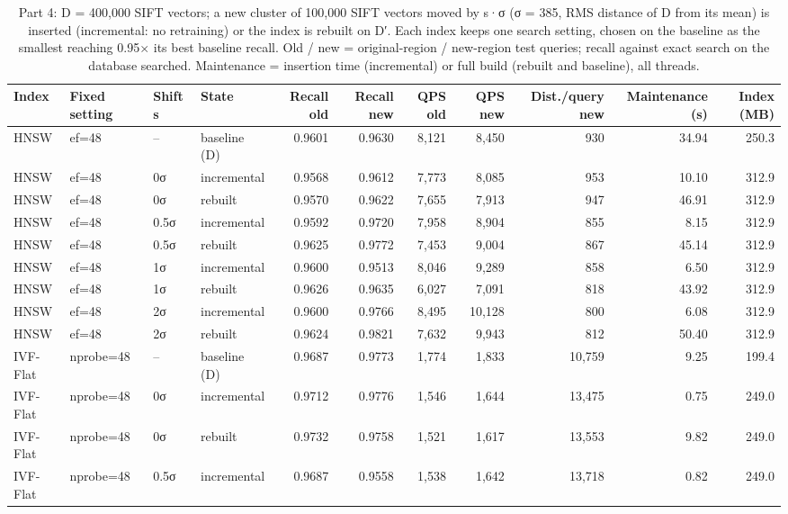 \begin{table}[t]
\centering
\small
\caption{Part 4: D = 400,000 SIFT vectors; a new cluster of 100,000 SIFT vectors moved by s·σ (σ = 385, RMS distance of D from its mean) is inserted (incremental: no retraining) or the index is rebuilt on D′. Each index keeps one search setting, chosen on the baseline as the smallest reaching 0.95$\times$ its best baseline recall. Old / new = original-region / new-region test queries; recall against exact search on the database searched. Maintenance = insertion time (incremental) or full build (rebuilt and baseline), all threads.}
\label{tab:t4a_drift_fixed_setting}
\begin{tabular}{llllrrrrrrr}
\toprule
Index & Fixed setting & Shift s & State & Recall old & Recall new & QPS old & QPS new & Dist./query new & Maintenance (s) & Index (MB) \\
\midrule
HNSW & ef=48 & -- & baseline (D) & 0.9601 & 0.9630 & 8,121 & 8,450 & 930 & 34.94 & 250.3 \\
HNSW & ef=48 & 0σ & incremental & 0.9568 & 0.9612 & 7,773 & 8,085 & 953 & 10.10 & 312.9 \\
HNSW & ef=48 & 0σ & rebuilt & 0.9570 & 0.9622 & 7,655 & 7,913 & 947 & 46.91 & 312.9 \\
HNSW & ef=48 & 0.5σ & incremental & 0.9592 & 0.9720 & 7,958 & 8,904 & 855 & 8.15 & 312.9 \\
HNSW & ef=48 & 0.5σ & rebuilt & 0.9625 & 0.9772 & 7,453 & 9,004 & 867 & 45.14 & 312.9 \\
HNSW & ef=48 & 1σ & incremental & 0.9600 & 0.9513 & 8,046 & 9,289 & 858 & 6.50 & 312.9 \\
HNSW & ef=48 & 1σ & rebuilt & 0.9626 & 0.9635 & 6,027 & 7,091 & 818 & 43.92 & 312.9 \\
HNSW & ef=48 & 2σ & incremental & 0.9600 & 0.9766 & 8,495 & 10,128 & 800 & 6.08 & 312.9 \\
HNSW & ef=48 & 2σ & rebuilt & 0.9624 & 0.9821 & 7,632 & 9,943 & 812 & 50.40 & 312.9 \\
IVF-Flat & nprobe=48 & -- & baseline (D) & 0.9687 & 0.9773 & 1,774 & 1,833 & 10,759 & 9.25 & 199.4 \\
IVF-Flat & nprobe=48 & 0σ & incremental & 0.9712 & 0.9776 & 1,546 & 1,644 & 13,475 & 0.75 & 249.0 \\
IVF-Flat & nprobe=48 & 0σ & rebuilt & 0.9732 & 0.9758 & 1,521 & 1,617 & 13,553 & 9.82 & 249.0 \\
IVF-Flat & nprobe=48 & 0.5σ & incremental & 0.9687 & 0.9558 & 1,538 & 1,642 & 13,718 & 0.82 & 249.0 \\

\end{tabular}
\end{table}
